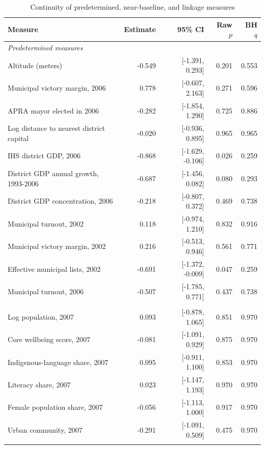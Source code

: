\begin{table}[!htbp]
\centering
\scriptsize
\caption{Continuity of predetermined, near-baseline, and linkage measures}
\label{tab:rd_validation_covariates}
\begin{tabular}{lrrrr}
\toprule
Measure & Estimate & 95\% CI & Raw \(p\) & BH \(q\) \\
\midrule
\multicolumn{5}{l}{\textit{Predetermined measures}} \\
Altitude (meters) & -0.549 & [-1.391, 0.293] & 0.201 & 0.553 \\
Municipal victory margin, 2006 & 0.778 & [-0.607, 2.163] & 0.271 & 0.596 \\
APRA mayor elected in 2006 & -0.282 & [-1.854, 1.290] & 0.725 & 0.886 \\
Log distance to nearest district capital & -0.020 & [-0.936, 0.895] & 0.965 & 0.965 \\
IHS district GDP, 2006 & -0.868 & [-1.629, -0.106] & 0.026 & 0.259 \\
District GDP annual growth, 1993-2006 & -0.687 & [-1.456, 0.082] & 0.080 & 0.293 \\
District GDP concentration, 2006 & -0.218 & [-0.807, 0.372] & 0.469 & 0.738 \\
Municipal turnout, 2002 & 0.118 & [-0.974, 1.210] & 0.832 & 0.916 \\
Municipal victory margin, 2002 & 0.216 & [-0.513, 0.946] & 0.561 & 0.771 \\
Effective municipal lists, 2002 & -0.691 & [-1.372, -0.009] & 0.047 & 0.259 \\
Municipal turnout, 2006 & -0.507 & [-1.785, 0.771] & 0.437 & 0.738 \\
\addlinespace
\multicolumn{5}{l}{\textit{2007 timing-sensitive measures}} \\
Log population, 2007 & 0.093 & [-0.878, 1.065] & 0.851 & 0.970 \\
Core wellbeing score, 2007 & -0.081 & [-1.091, 0.929] & 0.875 & 0.970 \\
Indigenous-language share, 2007 & 0.095 & [-0.911, 1.100] & 0.853 & 0.970 \\
Literacy share, 2007 & 0.023 & [-1.147, 1.193] & 0.970 & 0.970 \\
Female population share, 2007 & -0.056 & [-1.113, 1.000] & 0.917 & 0.970 \\
Urban community, 2007 & -0.291 & [-1.091, 0.509] & 0.475 & 0.970 \\
\addlinespace
\multicolumn{5}{l}{\textit{Linkage and availability measures}} \\

\end{tabular}
\end{table}
